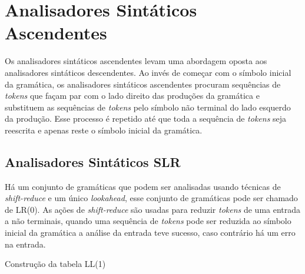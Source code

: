 \section{Analisadores Sintáticos Ascendentes}
Os analisadores sintáticos ascendentes levam uma abordagem oposta aos analisadores sintáticos descendentes. Ao invés de começar com o símbolo inicial da gramática, os analisadores sintáticos ascendentes procuram sequências de \textit{tokens} que façam par com o lado direito das produções da gramática e substituem as sequências de \textit{tokens} pelo símbolo não terminal do lado esquerdo da produção. Esse processo é repetido até que toda a sequência de \textit{tokens} seja reescrita e apenas reste o símbolo inicial da gramática.

\subsection{Analisadores Sintáticos SLR}
Há um conjunto de gramáticas que podem ser analisadas usando técnicas de \textit{shift-reduce} e um único \textit{lookahead}, esse conjunto de gramáticas pode ser chamado de LR(0). As ações de \textit{shift-reduce} são usadas para reduzir \textit{tokens} de uma entrada a não terminais, quando uma sequência de \textit{tokens} pode ser reduzida ao símbolo inicial da gramática a análise da entrada teve sucesso, caso contrário há um erro na entrada.

\begin{algorithm}[htp]
    \caption { Construção da tabela LL(1)}\label{alg:lltable}
    
\end{algorithm}

